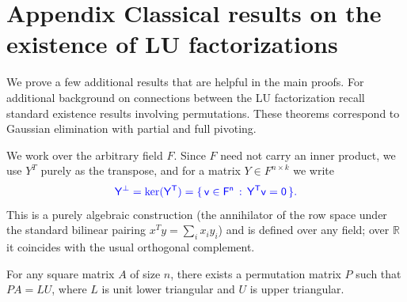 \documentclass[10pt,twoside]{siamart1116}
\newcommand{\by}{\times}
\numberwithin{theorem}{section}
\providecommand{\DIFadd}[1]{{\protect\color{blue} \sf #1}} %
\providecommand{\DIFdel}[1]{{\protect\color{red} \scriptsize #1}} %
\providecommand{\DIFaddbegin}{} %
\providecommand{\DIFaddend}{} %
\providecommand{\DIFdelbegin}{} %
\providecommand{\DIFdelend}{} %
\begin{document}
\appendix

\section{\DIFdelbegin \DIFdel{Appendix}\DIFdelend \DIFaddbegin \DIFadd{Classical results on the existence of LU factorizations}\DIFaddend }\DIFdelbegin %
\DIFdelend \DIFaddbegin \label{sec:classical}
\DIFaddend 

We \DIFdelbegin \DIFdel{prove a few additional results that are helpful in the main proofs.
For additional background on connections between the LU factorization}\DIFdelend \DIFaddbegin \DIFadd{recall standard existence results involving permutations. These theorems correspond to Gaussian elimination with partial and full pivoting.
}

\DIFadd{We work over the arbitrary field $F$. Since $F$ need not carry an inner product, we use $Y^T$ purely as the transpose, and for a matrix $Y \in F^{n \by k}$ we write
}\[ \DIFadd{Y^\perp = \ker(Y^T) = \{\, v \in F^n \,:\, Y^T v = 0 \,\}. }\]
\DIFadd{This is a purely algebraic construction (the annihilator of the row space under the standard bilinear pairing $x^T y = \sum_i x_i y_i$) and is defined over any field; over $\mathbb{R}$ it coincides with the usual orthogonal complement.
}

\begin{theorem}\label{thm:row_permutation}
  \DIFadd{For any square matrix $A$ of size $n$, there exists a permutation matrix $P$ such that $PA = LU$, where $L$ is unit lower triangular and $U$ is upper triangular.
}\end{theorem}
\end{document}
